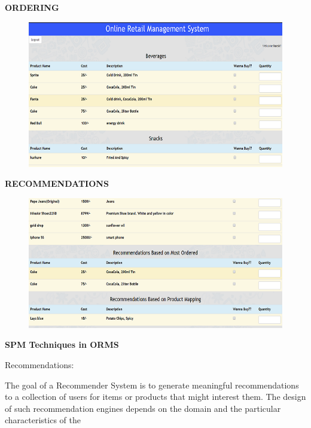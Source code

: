 \documentclass{tcc}
\begin{document}
\begin{center}
\textbf{\Large{ORDERING}}
\end{center}
\begin{figure}[H]
\centering
\includegraphics{images/sc3.PNG}\\
\end{figure}
\newpage
\begin{center}
\textbf{\Large{RECOMMENDATIONS}}
\end{center}
\begin{figure}[H]
\centering
\includegraphics{images/sc4.PNG}\\
\end{figure}
\begin{center}
\textbf{\Large{SPM Techniques in ORMS}}
\end{center}
\begin{flushleft}
\Large{{\selectfont
Recommendations:
}}
\end{flushleft}
The goal of a Recommender System is to generate meaningful recommendations to a collection of users for items or products that might interest them.  The design of such recommendation engines depends on the domain and the particular characteristics of the
\end{document}
